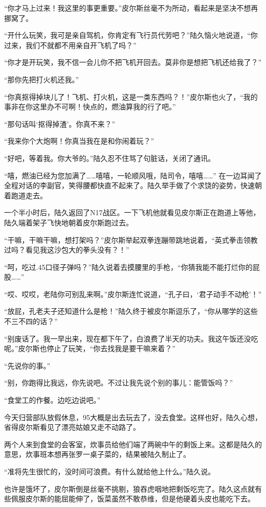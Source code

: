 “你才马上过来！我这里的事更重要。”皮尔斯丝毫不为所动，看起来是坚决不想再挪窝了。

“开什么玩笑，我可是亲自驾机，你肯定有飞行员代劳吧？”陆久恼火地说道，“你过来，我们不就都不用亲自开飞机了吗？”

“你才是开玩笑，我不信一会儿你不把飞机开回去。莫非你是想把飞机还给我了？”

“那你先把打火机还我。”

“你真抠得掉块儿了！飞机、打火机，这是一类东西吗？！”皮尔斯也火了，“我的事非在你这里办不可啊！快点的，燃油算我的行了吧。”

“那句话叫‘抠得掉渣’。你真不来？”

“我来你个大炮啊！你真当我在是和你闹着玩？”

“好吧，等着我。你大爷的。”陆久忍不住骂了句脏话，关闭了通讯。

“嘻，燃油已经为您加满了……嘻嘻，一轮顺风哦，陆司令，嘻嘻……” 在一边耳闻了全程对话的李副官，笑得腰都快直不起来了。陆久举手做了个求饶的姿势，快速朝着跑道走去。

一个半小时后，陆久返回了N17战区。一下飞机他就看见皮尔斯正在跑道上等他，陆久端着架子飞快地朝着皮尔斯跑过去。

“干嘛，干嘛干嘛，想打架吗？”皮尔斯举起双拳连蹦带跳地说着，“英式拳击领教过吗？看见我这沙包大的拳头没有？！”

“呵，吃过.45口径子弹吗？”陆久说着去摸腰里的手枪，“你猜我能不能打烂你的屁股……”

“哎、哎哎，老陆你可别乱来啊。”皮尔斯连忙说道，“孔子曰，‘君子动手不动枪’！”

“放屁，孔老夫子还知道什么是枪！”陆久终于被皮尔斯逗乐了，“你从哪学的这些不三不四的话？”

“别废话了。我一早出来，现在都下午了，白浪费了半天的功夫。我这午饭还没吃呢。”皮尔斯也停止了玩笑，“你去找我是要干嘛来着？”

“先说你的事。”

“别，你跑得比我远，你先说吧。不过让我先说个别的事儿：能管饭吗？”

“食堂工的作餐。边吃边说吧。”

今天归营部队放假休息，95大概是出去玩去了，没去食堂。这样也好，陆久心想，省得皮尔斯看见了漂亮姑娘又走不动路了。

两个人来到食堂的会客室，炊事员给他们端了两碗中午的剩饭上来。这都是陆久的意思，炊事班本想再张罗一桌子菜的，结果被陆久制止了。

“准将先生很忙的，没时间可浪费。有什么就给他上什么。”陆久说。

也许是饿坏了，皮尔斯倒是丝毫不挑剔，狼吞虎咽地把剩饭吃完了。陆久这点就有些佩服皮尔斯的能屈能伸了，饭菜虽然不敢恭维，但是他硬着头皮也能吃下去。

